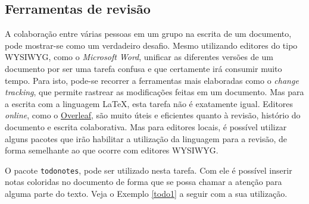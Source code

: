\subsection{Ferramentas de revisão}
\label{sec:ferrev}

A colaboração entre várias pessoas em um grupo na escrita de um documento, pode mostrar-se como um verdadeiro desafio. Mesmo utilizando editores do tipo WYSIWYG, como o \textit{Microsoft Word}, unificar as diferentes versões de um documento por ser uma tarefa confusa e que certamente irá consumir muito tempo. Para isto, pode-se recorrer a ferramentas mais elaboradas como o \textit{change tracking}, que permite rastrear as modificações feitas em um documento. Mas para a escrita com a linguagem \LaTeX{}, esta tarefa não é exatamente igual. Editores \textit{online}, como o \href{https://www.overleaf.com/}{Overleaf}, são muito úteis e eficientes quanto à revisão, histório do documento e escrita colaborativa. Mas para editores locais, é possível utilizar alguns pacotes que irão habilitar a utilização da linguagem para a revisão, de forma semelhante ao que ocorre com editores WYSIWYG.

O pacote {\tt todonotes}, pode ser utilizado nesta tarefa. Com ele é possível inserir notas coloridas no documento de forma que se possa chamar a atenção para alguma parte do texto. Veja o Exemplo \ref{todo1} a seguir com a sua utilização.

%
%
%
%
%
%
%
%
%
%

